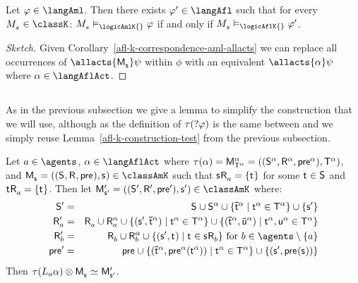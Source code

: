 \begin{corollary}\label{afl-k-correspondence-afl-aml}
Let $\phi \in \langAml$. 
Then there exists $\phi' \in \langAfl$ such that for every $\kPModel{\kStateS} \in \classK$: $\kPModel{\kStateS} \entails_\logicAmlK{} \phi$ if and only if $\kPModel{\kStateS} \entails_\logicAflK{} \phi'$.
\end{corollary}

\begin{proof}[Sketch]
Given Corollary~\ref{afl-k-correspondence-aml-allacts} we can replace all occurrences of $\allacts{\aPModel{\aStateS}} \psi$ within $\phi$ with an equivalent $\allacts{\alpha} \psi$ where $\alpha \in \langAflAct$.
\end{proof}

\subsection{\classKFF{}}

As in the previous subsection we give a lemma to simplify the construction that we will use, although as the definition of $\tau(?{\varphi})$ is the same between \classK{} and \classKFF{} we simply reuse Lemma~\ref{afl-k-construction-test} from the previous subsection.

\begin{lemma}\label{afl-kff-construction-learning}
Let $\agentA \in \agents$, $\alpha \in \langAflAct$ where $\tau(\alpha) = \aPModel[\alpha]{\aStatesT[\alpha]} = \aPModelTuple[\alpha]{\aStatesT[\alpha]}$, and $\aPModel{\aStateS} = \aPModelTuple{\aStateS} \in \classAmK$ such that $\aStateS \aAccessibility{\agentA} = \{\aStateT\}$ for some $\aStateT \in \aStates$ and $\aStateT \aAccessibility{\agentA} = \{\aStateT\}$.
Then let $\aPModelP{\aStateSP} = \aPModelTupleP{\aStateSP} \in \classAmK$ where:
\begin{eqnarray*}
    \aStatesP &=& \aStates \cup \aStates[\alpha] \cup \{\aPStateT[\alpha] \mid \aStateT[\alpha] \in \aStatesT[\alpha]\} \cup \{\aStateSP\}\\
    \aAccessibilityP{\agentA} &=& \aAccessibility{\agentA} \cup \aAccessibility[\alpha]{\agentA} \cup \{(\aStateSP, \aPStateT[\alpha]) \mid \aStateT[\alpha] \in \aStatesT[\alpha]\} \cup \{(\aPStateT[\alpha], \aPStateU[\alpha]) \mid \aStateT[\alpha], \aStateU[\alpha] \in \aStatesT[\alpha]\}\\
    \aAccessibilityP{\agentB} &=& \aAccessibility{\agentB} \cup \aAccessibility[\alpha]{\agentB} \cup \{(\aStateSP, \aStateT) \mid \aStateT \in \aStateS \aAccessibility{\agentB}\} \text{ for } \agentB \in \agents \setminus \{\agentA\}\\
    \aPreconditionP &=& \aPrecondition \cup \{(\aPStateT[\alpha], \aPrecondition[\alpha](\aStateT[\alpha])) \mid \aStateT[\alpha] \in \aStatesT[\alpha]\} \cup \{(\aStateSP, \aPrecondition(\aStateS))\}
\end{eqnarray*}
Then $\tau(\learns_\agentA \alpha) \exec \aPModel{\aStateS} \bisimilar \aPModelP{\aStateSP}$.
\end{lemma}

